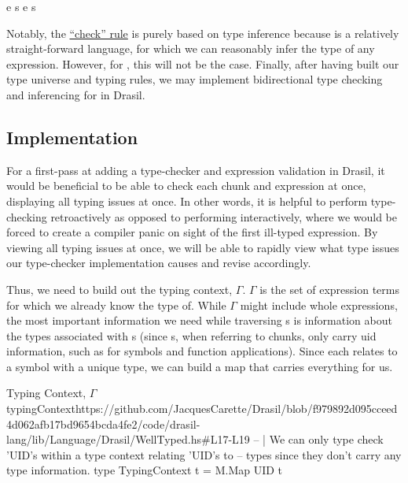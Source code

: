 
      {\Gamma \vdash e \Rightarrow s}
      {\Gamma \vdash e \Leftarrow s}

Notably, the \hyperlink{tr:check}{``check'' rule} is purely based on type
inference because \Expr{} is a relatively straight-forward language, for which
we can reasonably infer the type of any expression. However, for \ModelExpr{},
this will not be the case. Finally, after having built our type universe and
typing rules, we may implement bidirectional type checking and inferencing for
\Expr{} in Drasil.

\subsection{Implementation}
\label{chap:typed-expr:sec:typing-the-expression-language:subsec:implementation}

For a first-pass at adding a type-checker and expression validation in Drasil,
it would be beneficial to be able to check each chunk and expression at once,
displaying all typing issues at once. In other words, it is helpful to perform
type-checking retroactively as opposed to performing interactively, where we
would be forced to create a compiler panic on sight of the first ill-typed
expression. By viewing all typing issues at once, we will be able to rapidly
view what type issues our type-checker implementation causes and revise
accordingly.

Thus, we need to build out the typing context, \(\Gamma\). \(\Gamma\) is the set
of expression terms for which we already know the type of. While \(\Gamma\)
might include whole expressions, the most important information we need while
traversing \Expr{}s is information about the types associated with \UID{}s
(since \Expr{}s, when referring to chunks, only carry \acs{uid} information,
such as for symbols and function applications). Since each \UID{} relates to a
symbol with a unique type, we can build a map that carries everything for us.

\begin{haskell}{Typing Context, \(\Gamma\)}{typingContext}{https://github.com/JacquesCarette/Drasil/blob/f979892d095cceed4d062afb17bd9654bcda4fe2/code/drasil-lang/lib/Language/Drasil/WellTyped.hs\#L17-L19}
-- | We can only type check 'UID's within a type context relating 'UID's to
--   types since they don't carry any type information.
type TypingContext t = M.Map UID t
\end{haskell}

